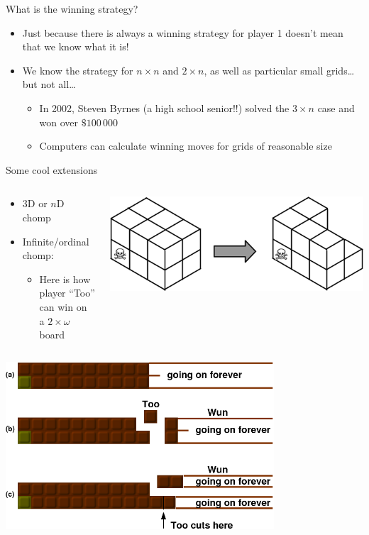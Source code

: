 	\begin{namedframe}{What is the winning strategy?}
		\begin{itemize}[<+(1)->]
			\item Just because there is always a winning strategy for player 1 doesn't mean that we know what it is!
			\item We know the strategy for $n \times n$ and $2 \times n$, as well as particular small grids\ldots{} but not all\ldots
			\begin{itemize}
				\item In 2002, Steven Byrnes (a high school senior!!) solved the $3 \times n$ case and won over $\$100\,000$
				\item Computers can calculate winning moves for grids of reasonable size
			\end{itemize}
		\end{itemize}
	\end{namedframe}
	\begin{namedframe}{Some cool extensions}
		\begin{columns}
			\begin{column}{0.5\textwidth}
				\begin{itemize}
					\item $3$D or $n$D chomp
					\item Infinite/ordinal chomp:
					\begin{itemize}
						\item Here is how player ``Too'' can win on a $2 \times \omega$ board
					\end{itemize}
				\end{itemize}
			\end{column}
			\begin{column}{0.5\textwidth}
				\includegraphics[width=\textwidth]{Images/Chomp3D}
			\end{column}
		\end{columns}
		\begin{center}
			\includegraphics[width=0.75\textwidth]{Images/Chomp4}
		\end{center}
	\end{namedframe}
